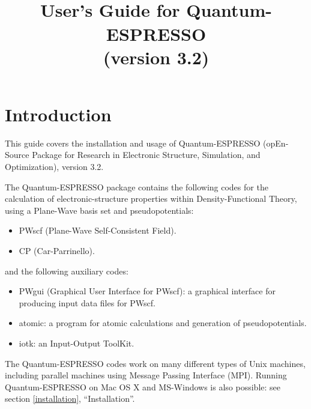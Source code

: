 \documentclass[12pt,a4paper]{article}
\def\version{3.2}
\begin{document}
 

\author{}
\date{}
\title{
  \hfill%
  \vspace{1.5cm}
  \\
  \huge User's Guide for Quantum-ESPRESSO \smallskip\\
  \Large (version \version)
}
\maketitle

\tableofcontents

\clearpage

\section{Introduction}

This guide covers the installation and usage of Quantum-ESPRESSO
(opEn-Source Package for Research in Electronic Structure, Simulation,
and Optimization), version \version.

The Quantum-ESPRESSO package contains the following codes for the
calculation of electronic-structure properties within
Density-Functional Theory, using a Plane-Wave basis set and
pseudopotentials:
\begin{itemize}
  \item PWscf (Plane-Wave Self-Consistent Field).
  \item CP (Car-Parrinello).
\end{itemize}
and the following auxiliary codes:
\begin{itemize}
  \item PWgui (Graphical User Interface for PWscf): a graphical
        interface for producing input data files for PWscf.
  \item atomic: a program for atomic calculations and generation of
        pseudopotentials.
  \item iotk: an Input-Output ToolKit.
\end{itemize}
%
The Quantum-ESPRESSO codes work on many different types of Unix machines,
including parallel machines using Message Passing Interface (MPI).
Running Quantum-ESPRESSO on Mac OS X and MS-Windows is also possible: 
see section \ref{installation}, ``Installation''.
\end{document}
